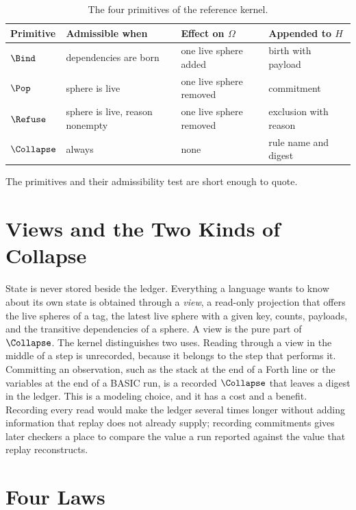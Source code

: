 \begin{table}[h]
\centering
\begin{tabular}{llll}
\toprule
Primitive & Admissible when & Effect on $\Omega$ & Appended to $H$\\
\midrule
$\Bind$ & dependencies are born & one live sphere added & birth with payload\\
$\Pop$ & sphere is live & one live sphere removed & commitment\\
$\Refuse$ & sphere is live, reason nonempty & one live sphere removed & exclusion with reason\\
$\Collapse$ & always & none & rule name and digest\\
\bottomrule
\end{tabular}
\caption{The four primitives of the reference kernel.}
\end{table}

The primitives and their admissibility test are short enough to quote.


\section{Views and the Two Kinds of Collapse}

State is never stored beside the ledger. Everything a language wants to know about its own state is obtained through a \emph{view}, a read-only projection that offers the live spheres of a tag, the latest live sphere with a given key, counts, payloads, and the transitive dependencies of a sphere. A view is the pure part of $\Collapse$. The kernel distinguishes two uses. Reading through a view in the middle of a step is unrecorded, because it belongs to the step that performs it. Committing an observation, such as the stack at the end of a Forth line or the variables at the end of a BASIC run, is a recorded $\Collapse$ that leaves a digest in the ledger. This is a modeling choice, and it has a cost and a benefit. Recording every read would make the ledger several times longer without adding information that replay does not already supply; recording commitments gives later checkers a place to compare the value a run reported against the value that replay reconstructs.

\section{Four Laws}

